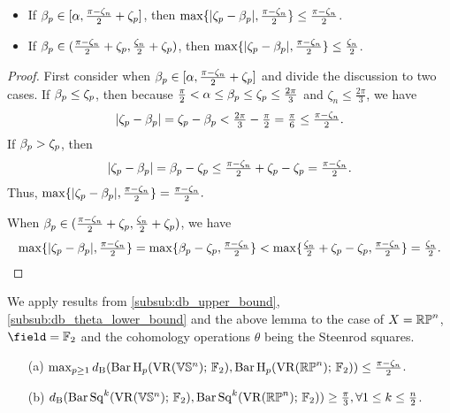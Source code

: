 \lemma 
\begin{itemize}
    \item If $\beta_p \in [\alpha, \tfrac{\pi - \zeta_n}{2}+\zeta_p]$, then
            $\max\{|\zeta_p  - \beta_p |, \tfrac{\pi - \zeta_n}{2}\}
            \leq \tfrac{\pi - \zeta_n}{2}$.
    \item If $\beta_p \in (\tfrac{\pi - \zeta_n}{2}+\zeta_p, \tfrac{\zeta_n}{2}+\zeta_p)$, then
            $\max\{|\zeta_p  - \beta_p |, \tfrac{\pi - \zeta_n}{2}\}
            \leq \tfrac{\zeta_n}{2}$.
\end{itemize}

\begin{proof}
        First consider when $\beta_p \in [\alpha, \tfrac{\pi - \zeta_n}{2}+\zeta_p]$ and divide the discussion to two cases.  
        If $\beta_p \leq \zeta_p$, then because $\tfrac{\pi}{2} < \alpha \leq \beta_p \leq \zeta_p  \leq \tfrac{2\pi}{3}$ and $\zeta_n \leq \tfrac{2\pi}{3}$, we have
        \[
            |\zeta_p  - \beta_p | 
            = \zeta_p  - \beta_p  
            < \tfrac{2\pi}{3} - \tfrac{\pi}{2} 
            = \tfrac{\pi}{6} 
            \leq \tfrac{\pi - \zeta_n}{2}.
        \]
        If $\beta_p > \zeta_p$, then 
        \[
            |\zeta_p  - \beta_p | 
            = \beta_p - \zeta_p
            \leq \tfrac{\pi - \zeta_n}{2} + \zeta_p - \zeta_p 
            = \tfrac{\pi - \zeta_n}{2}.
        \]
        Thus, $\max\{|\zeta_p  - \beta_p |, \tfrac{\pi - \zeta_n}{2}\} = \tfrac{\pi - \zeta_n}{2}.$
        
        When $\beta_p \in (\tfrac{\pi - \zeta_n}{2}+\zeta_p, \tfrac{\zeta_n}{2}+\zeta_p)$, we have
        \[
            \max\{|\zeta_p  - \beta_p |, \tfrac{\pi - \zeta_n}{2}\}
            = \max\{\beta_p - \zeta_p, \tfrac{\pi - \zeta_n}{2}\}
            < \max\{\tfrac{\zeta_n}{2}+\zeta_p - \zeta_p, \tfrac{\pi - \zeta_n}{2}\}
            = \tfrac{\zeta_n}{2} .
        \]
\end{proof}

We apply results from \cref{subsub:db_upper_bound}, \cref{subsub:db_theta_lower_bound} and the above lemma to the case of $X = \mathbb{RP}^n$, $\field = \Ftwo$ and the cohomology operations $\theta$ being the Steenrod squares.

\medskip\theorem
\begin{itemize} 
	\item[(a)] $\max_{p\geq 1}d_{\mathrm{B}}(\operatorname{Bar} \operatorname{H}_{p}(\operatorname{VR}(\mathbb{V}\mathbb{S}^n);\,{\mathbb{F}_2}), \operatorname{Bar} \operatorname{H}_{p}(\operatorname{VR}(\mathbb{RP}^n);\,{\mathbb{F}_2}))\leq \tfrac{\pi - \zeta_n}{2}$.
	\smallskip\item[(b)] $d_{\mathrm{B}}(\operatorname{Bar}\operatorname{Sq}^{k}(\operatorname{VR}(\mathbb{V}\mathbb{S}^n);\,{\mathbb{F}_2}), \operatorname{Bar}\operatorname{Sq}^{k}(\operatorname{VR}(\mathbb{RP}^n);\,{\mathbb{F}_2}))\geq \tfrac{\pi}{3},\forall 1\leq k\leq \tfrac{n}{2}$.
\end{itemize}

